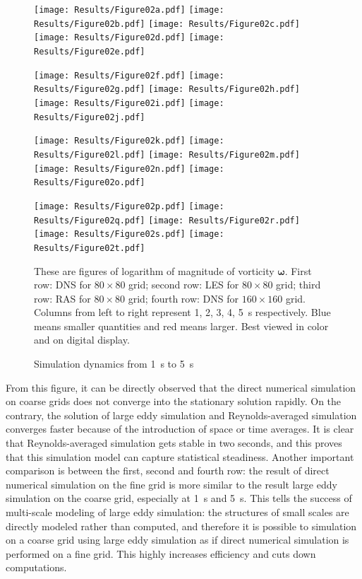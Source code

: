 \documentclass[english, nochinese]{pkupaper}
\begin{document}
\begin{figure}[htbp]
{
\centering
{
\texttt{[image: Results/Figure02a.pdf]}
\texttt{[image: Results/Figure02b.pdf]}
\texttt{[image: Results/Figure02c.pdf]}
\texttt{[image: Results/Figure02d.pdf]}
\texttt{[image: Results/Figure02e.pdf]}
}

{
\texttt{[image: Results/Figure02f.pdf]}
\texttt{[image: Results/Figure02g.pdf]}
\texttt{[image: Results/Figure02h.pdf]}
\texttt{[image: Results/Figure02i.pdf]}
\texttt{[image: Results/Figure02j.pdf]}
}

{
\texttt{[image: Results/Figure02k.pdf]}
\texttt{[image: Results/Figure02l.pdf]}
\texttt{[image: Results/Figure02m.pdf]}
\texttt{[image: Results/Figure02n.pdf]}
\texttt{[image: Results/Figure02o.pdf]}
}

{
\texttt{[image: Results/Figure02p.pdf]}
\texttt{[image: Results/Figure02q.pdf]}
\texttt{[image: Results/Figure02r.pdf]}
\texttt{[image: Results/Figure02s.pdf]}
\texttt{[image: Results/Figure02t.pdf]}
}
\caption{Simulation dynamics from \SI{1}{s} to \SI{5}{s}}
\label{Fig:Dy}
}
{
\footnotesize
These are figures of logarithm of magnitude of vorticity $\bm{\omega}$. First row: DNS for $ 80 \times 80 $ grid; second row: LES for $ 80 \times 80 $ grid; third row: RAS for $ 80 \times 80 $ grid; fourth row: DNS for $ 160 \times 160 $ grid. Columns from left to right represent 1, 2, 3, 4, \SI{5}{\second} respectively. Blue means smaller quantities and red means larger. Best viewed in color and on digital display.
}
\end{figure}

From this figure, it can be directly observed that the direct numerical simulation on coarse grids does not converge into the stationary solution rapidly. On the contrary, the solution of large eddy simulation and Reynolds-averaged simulation converges faster because of the introduction of space or time averages. It is clear that Reynolds-averaged simulation gets stable in two seconds, and this proves that this simulation model can capture statistical steadiness. Another important comparison is between the first, second and fourth row: the result of direct numerical simulation on the fine grid is more similar to the result large eddy simulation on the coarse grid, especially at \SI{1}{\second} and \SI{5}{\second}. This tells the success of multi-scale modeling of large eddy simulation: the structures of small scales are directly modeled rather than computed, and therefore it is possible to simulation on a coarse grid using large eddy simulation as if direct numerical simulation is performed on a fine grid. This highly increases efficiency and cuts down computations.
\end{document}
